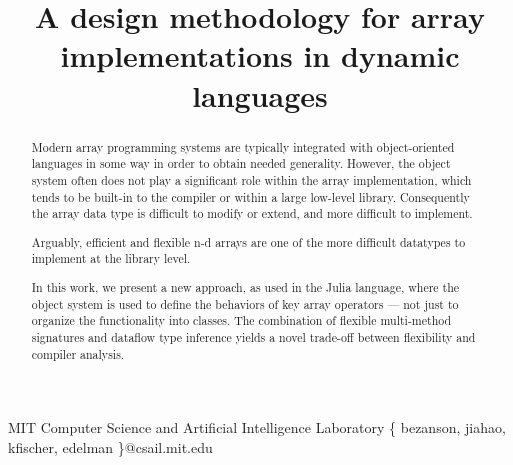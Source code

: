 \documentclass[preprint]{sigplanconf}
\begin{document}
\setlength{\pdfpageheight}{\paperheight}
\setlength{\pdfpagewidth}{\paperwidth}




\permissiontopublish             %



\title{ A design methodology for array implementations in dynamic languages }

           {MIT Computer Science and Artificial Intelligence Laboratory}
           {\{ bezanson, jiahao, kfischer, edelman \}@csail.mit.edu}


\maketitle

\begin{abstract}
Modern array programming systems are typically integrated with object-oriented
languages in some way in order to obtain needed generality. However, the
object system often does not play a significant role within the array
implementation, which tends to be built-in to the compiler or within a
large low-level library. Consequently the array data type is difficult to
modify or extend, and more difficult to implement.

Arguably, efficient
and flexible n-d arrays are one of the more difficult datatypes to implement
at the library level.

In this work, we present a new approach, as used in
the Julia language, where the object system is used to define the behaviors
of key array operators   --- not just to organize the functionality into
classes.
The combination of flexible multi-method
signatures and dataflow type inference yields a novel trade-off between
flexibility and compiler analysis.
\end{abstract}
\end{document}
